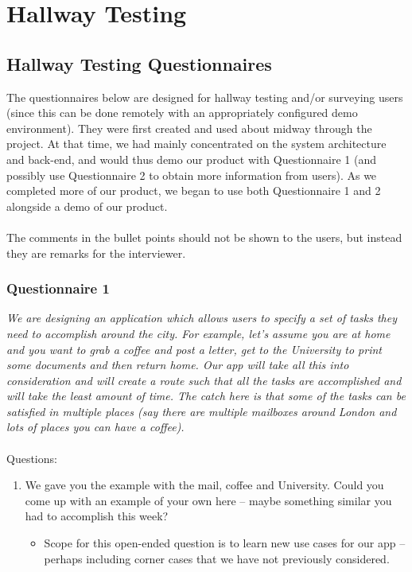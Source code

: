 \documentclass[a4paper, 10pt]{report}
\begin{document}
\begin{appendices}
\begin{thebibliography}{99}
\end{thebibliography}

\chapter{Hallway Testing}
\section{Hallway Testing Questionnaires}
The questionnaires below are designed for hallway testing and/or surveying users (since this can be done remotely with an appropriately configured demo environment). They were first created and used about midway through the project. At that time, we had mainly concentrated on the system architecture and back-end, and would thus demo our product with Questionnaire 1 (and possibly use Questionnaire 2 to obtain more information from users). As we completed more of our product, we began to use both Questionnaire 1 and 2 alongside a demo of our product. \\\\
The comments in the bullet points should not be shown to the users, but instead they are remarks for the interviewer. \subsection*{Questionnaire 1}
\textit{We are designing an application which allows users to specify a set of tasks they need to accomplish around the city. For example, let's assume you are at home and you want to grab a coffee and post a letter, get to the University to print some documents and then return home. Our app will take all this into consideration and will create a route such that all the tasks are accomplished and will take the least amount of time. The catch here is that some of the tasks can be satisfied in multiple places (say there are multiple mailboxes around London and lots of places you can have a coffee).} \\\\
Questions:
\begin{enumerate}
\item We gave you the example with the mail, coffee and University. Could you come up with an example of your own here -- maybe something similar you had to accomplish this week?
\begin{itemize}
\item Scope for this open-ended question is to learn new use cases for our app -- perhaps including corner cases that we have not previously considered. 

\end{itemize}
\end{enumerate}
\end{appendices}
\end{document}
